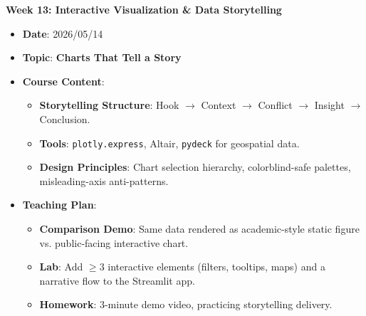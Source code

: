 \noindent\textbf{Week 13: Interactive Visualization \& Data Storytelling}
\begin{itemize}
    \item \textbf{Date}: 2026/05/14
    \item \textbf{Topic}: \textbf{Charts That Tell a Story}
    \item \textbf{Course Content}:
    \begin{itemize}
        \item \textbf{Storytelling Structure}: Hook $\rightarrow$ Context $\rightarrow$ Conflict $\rightarrow$ Insight $\rightarrow$ Conclusion.
        \item \textbf{Tools}: \texttt{plotly.express}, Altair, \texttt{pydeck} for geospatial data.
        \item \textbf{Design Principles}: Chart selection hierarchy, colorblind-safe palettes, misleading-axis anti-patterns.
    \end{itemize}
    \item \textbf{Teaching Plan}:
    \begin{itemize}
        \item \textbf{Comparison Demo}: Same data rendered as academic-style static figure vs. public-facing interactive chart.
        \item \textbf{Lab}: Add $\geq 3$ interactive elements (filters, tooltips, maps) and a narrative flow to the Streamlit app.
        \item \textbf{Homework}: 3-minute demo video, practicing storytelling delivery.
    \end{itemize}
\end{itemize}

